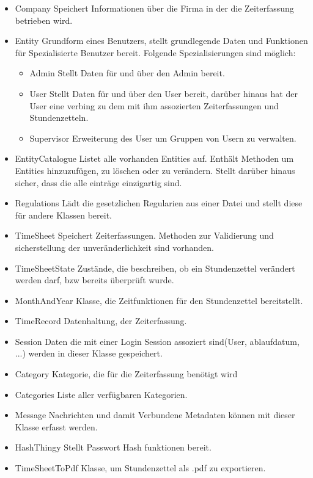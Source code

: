         \begin{itemize}
            \item{Company}
                Speichert Informationen über die Firma in der die Zeiterfassung betrieben wird.
            \item{Entity}
                Grundform eines Benutzers, stellt grundlegende Daten und Funktionen für Spezialisierte Benutzer bereit.
                Folgende Spezialisierungen sind möglich:
                \begin{itemize}
                    \item{Admin}
                        Stellt Daten für und über den Admin bereit.
                    \item{User}
                        Stellt Daten für und über den User bereit, darüber hinaus hat der User eine verbing zu dem mit ihm assozierten Zeiterfassungen und Stundenzetteln.
                    \item{Supervisor}
                        Erweiterung des User um Gruppen von Usern zu verwalten.
                \end{itemize}
            \item{EntityCatalogue}
                Listet alle vorhanden Entities auf. Enthält Methoden um Entities hinzuzufügen, zu löschen oder zu verändern. Stellt darüber hinaus sicher, dass die alle einträge einzigartig sind.
            \item{Regulations}
                Lädt die gesetzlichen Regularien aus einer Datei und stellt diese für andere Klassen bereit.
            \item{TimeSheet}
                Speichert Zeiterfassungen. Methoden zur Validierung und sicherstellung der unveränderlichkeit sind vorhanden.
            \item{TimeSheetState}
                Zustände, die beschreiben, ob ein Stundenzettel verändert werden darf, bzw bereits überprüft wurde.
            \item{MonthAndYear}
                Klasse, die Zeitfunktionen für den Stundenzettel bereitstellt.
            \item{TimeRecord}
                Datenhaltung, der Zeiterfassung.
            \item{Session}
                Daten die mit einer Login Session assoziert sind(User, ablaufdatum, ...) werden in dieser Klasse gespeichert.
            \item{Category}
                Kategorie, die für die Zeiterfassung benötigt wird
            \item{Categories}
                Liste aller verfügbaren Kategorien.
            \item{Message}
                Nachrichten und damit Verbundene Metadaten können mit dieser Klasse erfasst werden.
            \item{HashThingy}
                Stellt Passwort Hash funktionen bereit.
            \item{TimeSheetToPdf}
                Klasse, um Stundenzettel als .pdf zu exportieren.
        \end{itemize}

